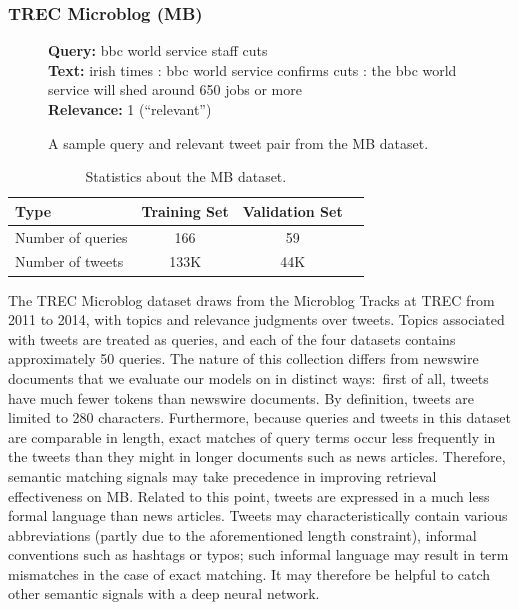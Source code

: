 \subsubsection{TREC Microblog (MB)}

\begin{figure}[t!]
	\begin{framed}
    		\textbf{Query:} bbc world service staff cuts \\
    		\textbf{Text:} irish times : bbc world service confirms cuts : the bbc world service will shed around 650 jobs or more \\
    		\textbf{Relevance:} 1 (``relevant'')
	\end{framed}
\label{mb-example}
 \caption{A sample query and relevant tweet pair from the MB dataset.}
\end{figure}

\begin{table}[t]
\vspace{0.2cm}
\centering
\begin{tabular}{lccc}
\toprule
\textbf{Type} \mbox{\hspace{0.5cm}} & \textbf{Training Set} \mbox{\hspace{1.0cm}} & \textbf{Validation Set} \mbox{\hspace{1.0cm}} \\
\toprule
Number of queries & 166 & 59 \\
Number  of tweets & 133K & 44K  \\
\bottomrule
\end{tabular}
\vspace{0.2cm}
\caption{Statistics about the MB dataset.}
\label{tab:mb-stats}
\end{table}

The TREC Microblog dataset draws from the Microblog Tracks at TREC from 2011 to 2014, with topics and relevance judgments over tweets.
Topics associated with tweets are treated as queries, and each of the four datasets contains approximately 50 queries.
The nature of this collection differs from newswire documents that we evaluate our models on in distinct ways:\
first of all, tweets have much fewer tokens than newswire documents.
By definition, tweets are limited to 280 characters.
Furthermore, because queries and tweets in this dataset are comparable in length, exact matches of query terms occur less frequently in the tweets than they might in longer documents such as news articles.
Therefore, semantic matching signals may take precedence in improving retrieval effectiveness on MB.
Related to this point, tweets are expressed in a much less formal language than news articles.
Tweets may characteristically contain various abbreviations (partly due to the aforementioned length constraint), informal conventions such as hashtags or typos; such informal language may result in term mismatches in the case of exact matching.
It may therefore be helpful to catch other semantic signals with a deep neural network.

